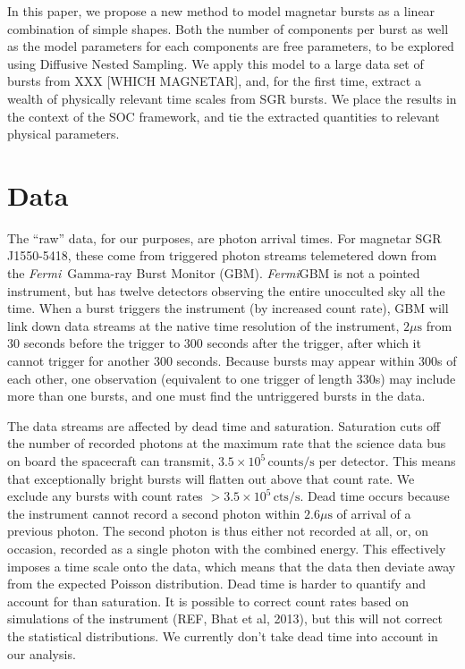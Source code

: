 \documentclass[12pt]{article}
\newcommand{\project}[1]{\textsl{#1}}
\newcommand{\Fermi}{\project{Fermi}}
\begin{document}
In this paper, we propose a new method to model magnetar bursts as a linear combination of simple shapes. Both the number of components
per burst as well as the model parameters for each components are free parameters, to be explored using Diffusive Nested Sampling.
We apply this model to a large data set of bursts from XXX [WHICH MAGNETAR], and, for the first time, extract a wealth of 
physically relevant time scales from SGR bursts. We place the results in the context of the SOC framework, and tie the extracted
quantities to relevant physical parameters.


\section{Data}

The ``raw'' data, for our purposes, are photon arrival times.
For magnetar SGR J1550-5418, these come from triggered photon streams telemetered down from the \Fermi\ Gamma-ray Burst Monitor (GBM).
\Fermi\/GBM is not a pointed instrument, but has twelve detectors observing the entire unocculted sky all the time. When a burst triggers the
instrument (by increased count rate), GBM will link down data streams at the native time resolution of the instrument, $2\mu\mathrm{s}$ from 
$30$ seconds before the trigger to $300$ seconds after the trigger, after which it cannot trigger for another $300$ seconds. 
Because bursts may appear within $300$s of each other, one observation (equivalent to one trigger of length $330$s) may include more than one
bursts, and one must find the untriggered bursts in the data.

The data streams are affected by dead time and saturation. Saturation cuts off the number of recorded photons at the maximum rate
that the science data bus on board the spacecraft can transmit, $3.5 \times 10^{5} \, \mathrm{counts}/\mathrm{s}$ per detector. This means
that exceptionally bright bursts will flatten out above that count rate. We exclude any bursts with count rates $>3.5\times10^{5} \, \mathrm{cts}/\mathrm{s}$.
Dead time occurs because the instrument cannot record a second photon within $2.6\mu\mathrm{s}$ of arrival of a previous photon. 
The second photon is thus either not recorded at all, or, on occasion, recorded as a single photon with the combined energy. This effectively 
imposes a time scale onto the data, which means that the data then deviate away from the expected Poisson distribution. 
Dead time is harder to quantify and account for than saturation. It is possible to correct count rates based on simulations of the instrument (REF, Bhat et al, 2013),
but this will not correct the statistical distributions. We currently don't take dead time into account in our analysis. 
\end{document}
